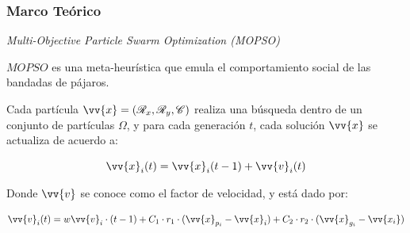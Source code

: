 \documentclass[usenames,dvipsnames]{beamer}
\begin{document}
\begin{frame}
\frametitle{Marco Teórico} 
\begin{exampleblock}{\textit{Multi-Objective Particle Swarm Optimization (MOPSO)}}

$MOPSO$ es una meta-heurística que emula el comportamiento social de las bandadas de pájaros.

Cada partícula $\vv{x}=(\mathscr{R}_x, \mathscr{R}_y, \mathscr{C})$ realiza una búsqueda dentro de un conjunto de partículas $\Omega$, y para cada generación $t$, cada solución $\vv{x}$ se actualiza de acuerdo a:

\begin{equation}\label{eq:posicion1}
\vv{x}_i(t) = \vv{x}_i(t-1) + \vv{v}_i(t)
\end{equation}

Donde $\vv{v}$ se conoce como el factor de velocidad, y está dado por:

\begin{equation}\label{eq:velocidad1}
\vv{v}_i(t) = w \vv{v}_i\cdot (t-1) + C_1 \cdot r_1 \cdot (\vv{x}_{p_i} - \vv{x}_i) + C_2 \cdot r_2 \cdot (\vv{x}_{g_i} - \vv{x_i})
\end{equation}

\end{exampleblock}


\end{frame}
\end{document}
